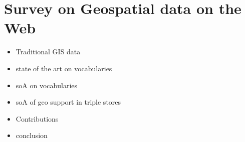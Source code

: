 \chapter{Survey on Geospatial data on the Web}
\label{ch:ch1}

\begin{itemize}
\item Traditional GIS data
\item state of the art on vocabularies
\item soA on vocabularies
\item soA of geo support in triple stores
\item Contributions
\item conclusion
\end{itemize}
